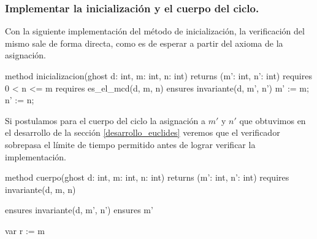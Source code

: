 \documentclass[12pt, a4paper, openany, fleqn]{book}
\begin{document}
\subsubsection{Implementar la inicialización y el cuerpo del ciclo.}

    Con la siguiente implementación del método de inicialización, la verificación del mismo sale de forma directa, como es de esperar a partir del axioma de la asignación.

    \begin{greenbox}
    \begin{dafny}[gobble=8]
        method inicializacion(ghost d: int, m: int, n: int)
            returns (m': int, n': int)
            requires 0 < n <= m
            requires es_el_mcd(d, m, n)
            ensures invariante(d, m', n')
        {
            m' := m;
            n' := n;
        }
    \end{dafny}
    \end{greenbox}

    Si postulamos para el cuerpo del ciclo la asignación a $m'$ y $n'$ que obtuvimos en el desarrollo de la sección \ref{desarrollo_euclides} veremos que el verificador sobrepasa el límite de tiempo permitido antes de lograr verificar la implementación.

    \begin{whitebox}[before skip=2ex]
    \begin{dafny}[gobble=8]
        method cuerpo(ghost d: int, m: int, n: int)
            returns (m': int, n': int)
            requires invariante(d, m, n)
    \end{dafny}
    \end{whitebox}
    \begin{redbox}
    \begin{dafny}[gobble=8,firstnumber=4]
            ensures invariante(d, m', n')
            ensures m' %
    \end{dafny}
    \end{redbox}
    \begin{whitebox}
    \begin{dafny}[gobble=8,firstnumber=6]
        {
    \end{dafny}
    \end{whitebox}

    \begin{redbox}
    \begin{dafny}[gobble=8,firstnumber=7]
            var r := m %
    \end{dafny}
    \end{redbox}
\end{document}
